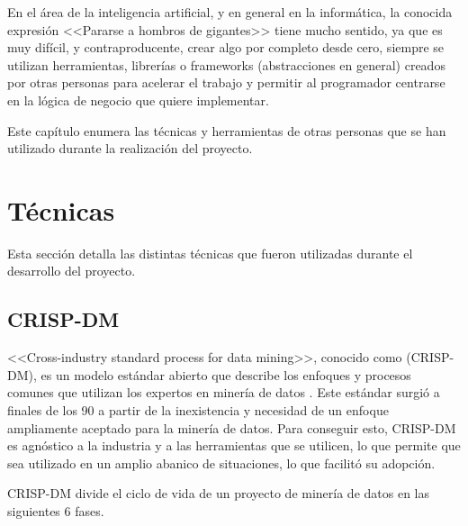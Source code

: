 \label{cha:Técnicas y herramientas}

En el área de la inteligencia artificial, y en general en la informática, la
conocida expresión <<Pararse a hombros de gigantes>> tiene mucho sentido, ya que
es muy difícil, y contraproducente, crear algo por completo desde cero, siempre
se utilizan herramientas, librerías o frameworks (abstracciones en general)
creados por otras personas para acelerar el trabajo y permitir al programador
centrarse en la lógica de negocio que quiere implementar.

Este capítulo enumera las técnicas y herramientas de otras personas que se han
utilizado durante la realización del proyecto.

\section{Técnicas}

Esta sección detalla las distintas técnicas que fueron utilizadas durante el
desarrollo del proyecto.

\subsection{CRISP-DM}

<<Cross-industry standard process for data mining>>, conocido como (CRISP-DM),
es un modelo estándar abierto que describe los enfoques y procesos comunes que
utilizan los expertos en minería de datos \cite{shearer2000crisp}. Este estándar
surgió a finales de los 90 a partir de la inexistencia y necesidad de un enfoque
ampliamente aceptado para la minería de datos. Para conseguir esto, CRISP-DM es
agnóstico a la industria y a las herramientas que se utilicen, lo que permite
que sea utilizado en un amplio abanico de situaciones, lo que facilitó su
adopción.

CRISP-DM divide el ciclo de vida de un proyecto de minería de datos en las
siguientes 6 fases.

